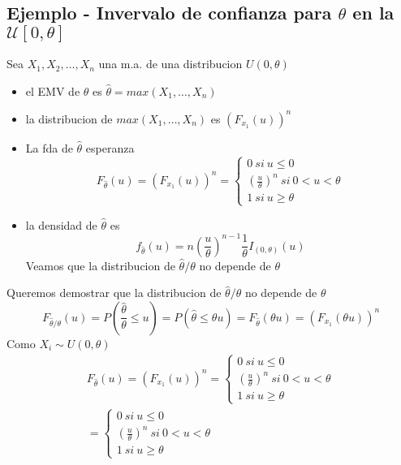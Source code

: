 \documentclass[a4paper]{article}
\begin{document}
\subsection{Ejemplo - Invervalo de confianza para $\theta$ en la $\mathcal{U}[0, \theta]$}
Sea $X_1, X_2,\dots,X_n$ una m.a. de una distribucion $U(0, \theta)$
\begin{itemize}
    \item el EMV de $\theta$ es $\hat{\theta} = max(X_1,\dots,X_n)$ 
    \item la distribucion de $max(X_1,\dots,X_n)$ es $(F_{x_1}(u))^n$
    \item La fda de $\hat{\theta}$ esperanza
    \begin{equation*}
        F_{\hat{\theta}}(u) = (F_{x_1}(u))^n = 
        \begin{cases}
            0 \ si \ u\leq 0
            \\
            \left(\frac{u}{\theta}\right)^n \ si \ 0 < u < \theta
            \\
            1 \ si \ u\geq \theta
        \end{cases}
    \end{equation*}
    \item la densidad de $\hat{\theta}$ es
    \begin{equation*}
        f_{\hat{\theta}}(u) = n\left(\frac{u}{\theta}\right)^{n-1} \frac{1}{\theta} I_{(0,\theta)}(u)
    \end{equation*}
    Veamos que la distribucion de $\hat{\theta}/\theta$ no depende de $\theta$
\end{itemize}
Queremos demostrar que la distribucion de $\hat{\theta}/\theta$ no depende de $\theta$
\begin{equation*}
    F_{\hat{\theta} / \theta}(u) = P\left(\frac{\hat{\theta}}{\theta} \leq u \right) = P(\hat{\theta} \leq \theta u) = F_{\hat{\theta}}(\theta u) = (F_{x_1}(\theta u))^n
\end{equation*}
Como $X_i \sim U(0, \theta)$
\begin{gather*}
    F_{\hat{\theta}}(u) = (F_{x_1}(u))^n = 
    \begin{cases}
        0 \ si \ u\leq 0
        \\
        \left(\frac{u}{\theta}\right)^n \ si \ 0 < u < \theta
        \\
        1 \ si \ u\geq \theta
    \end{cases}
    \\
    =
    \begin{cases}
        0 \ si \ u\leq 0
        \\
        \left(\frac{u}{\theta}\right)^n \ si \ 0 < u < \theta
        \\
        1 \ si \ u\geq \theta
    \end{cases}
\end{gather*}
\end{document}

